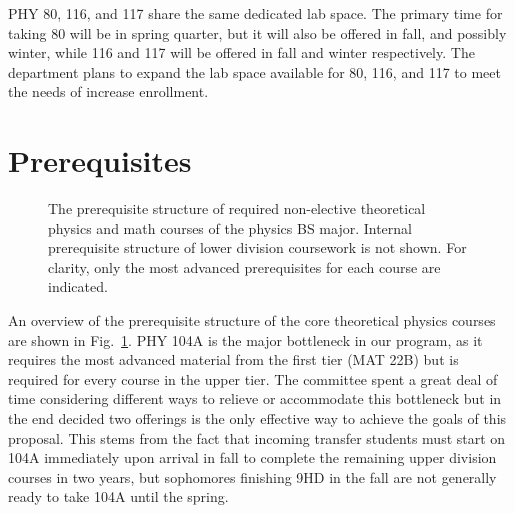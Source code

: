 \documentclass[12pt]{article}
\begin{document}
PHY 80, 116, and 117 share the same dedicated lab space.  The primary
time for taking 80 will be in spring quarter, but it will also be
offered in fall, and possibly winter, while 116 and 117 will be
offered in fall and winter respectively.  The department plans to
expand the lab space available for 80, 116, and 117 to meet the needs
of increase enrollment.

\section{Prerequisites}

\begin{figure}
\begin{center}

\caption{\label{fig:prereqs} The prerequisite structure of required
  non-elective theoretical physics and math courses of the physics BS
  major.  Internal prerequisite structure of lower division coursework
  is not shown.  For clarity, only the most advanced prerequisites for
  each course are indicated.}
\end{center}
\end{figure}

An overview of the prerequisite structure of the core theoretical
physics courses are shown in Fig.~\ref{fig:prereqs}.  PHY 104A is the
major bottleneck in our program, as it requires the most advanced
material from the first tier (MAT 22B) but is required for every
course in the upper tier.  The committee spent a great deal of time
considering different ways to relieve or accommodate this bottleneck
but in the end decided two offerings is the only effective way to
achieve the goals of this proposal.  This stems from the fact that
incoming transfer students must start on 104A immediately upon arrival
in fall to complete the remaining upper division courses in two years,
but sophomores finishing 9HD in the fall are not generally ready to
take 104A until the spring.
\end{document}
